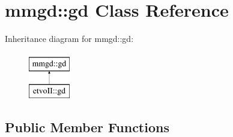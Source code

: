 \hypertarget{classmmgd_1_1gd}{}\section{mmgd\+:\+:gd Class Reference}
\label{classmmgd_1_1gd}
Inheritance diagram for mmgd\+:\+:gd\+:\begin{figure}[H]
\begin{center}
\leavevmode
\includegraphics[height=2.000000cm]{classmmgd_1_1gd}
\end{center}
\end{figure}
\subsection*{Public Member Functions}
